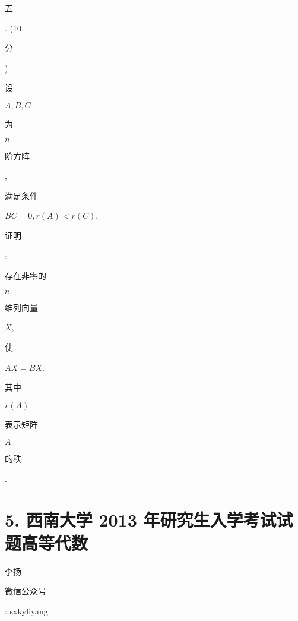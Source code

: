 \documentclass[10pt]{article}
\begin{document}
\begin{CJK}{UTF8}{mj}五\end{CJK}. (10 \begin{CJK}{UTF8}{mj}分\end{CJK}) \begin{CJK}{UTF8}{mj}设\end{CJK} $A, B, C$ \begin{CJK}{UTF8}{mj}为\end{CJK} $n$ \begin{CJK}{UTF8}{mj}阶方阵\end{CJK}, \begin{CJK}{UTF8}{mj}满足条件\end{CJK} $B C=0, r(A)<r(C)$. \begin{CJK}{UTF8}{mj}证明\end{CJK}: \begin{CJK}{UTF8}{mj}存在非零的\end{CJK} $n$ \begin{CJK}{UTF8}{mj}维列向量\end{CJK} $X$, \begin{CJK}{UTF8}{mj}使\end{CJK} $A X=B X$. \begin{CJK}{UTF8}{mj}其中\end{CJK} $r(A)$ \begin{CJK}{UTF8}{mj}表示矩阵\end{CJK} $A$ \begin{CJK}{UTF8}{mj}的秩\end{CJK}.

\section{5. 西南大学 2013 年研究生入学考试试题高等代数}
\begin{CJK}{UTF8}{mj}李扬\end{CJK}

\begin{CJK}{UTF8}{mj}微信公众号\end{CJK}: sxkyliyang
\end{document}
